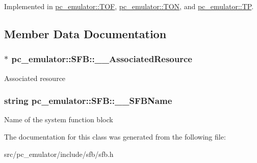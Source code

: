 Implemented in \hyperlink{classpc__emulator_1_1TOF_af5b934b5b41edf9413ebfabbed0cefbf}{pc\+\_\+emulator\+::\+T\+OF}, \hyperlink{classpc__emulator_1_1TON_aa855616778006d5b62414a0cc8a8bd45}{pc\+\_\+emulator\+::\+T\+ON}, and \hyperlink{classpc__emulator_1_1TP_a0d517c43fcaf487d269a2566fb246c59}{pc\+\_\+emulator\+::\+TP}.



\subsection{Member Data Documentation}
\subsubsection[{\texorpdfstring{\+\_\+\+\_\+\+Associated\+Resource}{__AssociatedResource}}]{$\ast$ pc\+\_\+emulator\+::\+S\+F\+B\+::\+\_\+\+\_\+\+Associated\+Resource}\hypertarget{classpc__emulator_1_1SFB_a8bc5e206d36f20b70f3f28ad9f83c713}{}\label{classpc__emulator_1_1SFB_a8bc5e206d36f20b70f3f28ad9f83c713}
Associated resource 
\subsubsection[{\texorpdfstring{\+\_\+\+\_\+\+S\+F\+B\+Name}{__SFBName}}]{\setlength{\rightskip}{0pt plus 5cm}string pc\+\_\+emulator\+::\+S\+F\+B\+::\+\_\+\+\_\+\+S\+F\+B\+Name}\hypertarget{classpc__emulator_1_1SFB_af82a0d98ab9fd95847138ef0f8e3cf10}{}\label{classpc__emulator_1_1SFB_af82a0d98ab9fd95847138ef0f8e3cf10}
Name of the system function block 

The documentation for this class was generated from the following file\+:\begin{DoxyCompactItemize}
\item 
src/pc\+\_\+emulator/include/sfb/sfb.\+h\end{DoxyCompactItemize}
